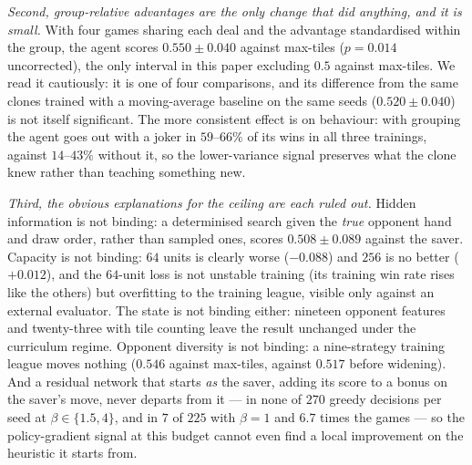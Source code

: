 \documentclass[11pt]{article}
\begin{document}
\emph{Second, group-relative advantages \cite{shao2024} are the only change that did anything, and it is small.} With four games sharing each deal and the advantage standardised within the group, the agent scores $0.550\pm0.040$ against max-tiles ($p=0.014$ uncorrected), the only interval in this paper excluding $0.5$ against max-tiles. We read it cautiously: it is one of four comparisons, and its difference from the same clones trained with a moving-average baseline on the same seeds ($0.520\pm0.040$) is not itself significant. The more consistent effect is on behaviour: with grouping the agent goes out with a joker in $59$--$66\%$ of its wins in all three trainings, against $14$--$43\%$ without it, so the lower-variance signal preserves what the clone knew rather than teaching something new.

\emph{Third, the obvious explanations for the ceiling are each ruled out.} Hidden information is not binding: a determinised search given the \emph{true} opponent hand and draw order, rather than sampled ones, scores $0.508\pm0.089$ against the saver. Capacity is not binding: $64$ units is clearly worse ($-0.088$) and $256$ is no better ($+0.012$), and the $64$-unit loss is not unstable training (its training win rate rises like the others) but overfitting to the training league, visible only against an external evaluator. The state is not binding either: nineteen opponent features and twenty-three with tile counting leave the result unchanged under the curriculum regime. Opponent diversity is not binding: a nine-strategy training league moves nothing ($0.546$ against max-tiles, against $0.517$ before widening). And a residual network that starts \emph{as} the saver, adding its score to a bonus on the saver's move, never departs from it --- in none of $270$ greedy decisions per seed at $\beta\in\{1.5,4\}$, and in $7$ of $225$ with $\beta=1$ and $6.7$ times the games --- so the policy-gradient signal at this budget cannot even find a local improvement on the heuristic it starts from.
\end{document}
